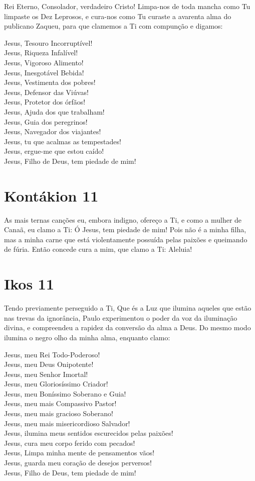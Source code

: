 \documentclass{subfiles}
\begin{document}
Rei Eterno, Consolador, verdadeiro Cristo! Limpa-nos de toda mancha
como Tu limpaste os Dez Leprosos, e cura-nos como Tu curaste a avarenta
alma do publicano Zaqueu, para que clamemos a Ti com compunção e
digamos:

Jesus, Tesouro Incorruptível! \\
Jesus, Riqueza Infalível! \\
Jesus, Vigoroso Alimento! \\
Jesus, Inesgotável Bebida! \\
Jesus, Vestimenta dos pobres! \\
Jesus, Defensor das Viúvas! \\
Jesus, Protetor dos órfãos! \\
Jesus, Ajuda dos que trabalham! \\
Jesus, Guia dos peregrinos! \\
Jesus, Navegador dos viajantes! \\
Jesus, tu que acalmas as tempestades! \\
Jesus, ergue-me que estou caído! \\
Jesus, Filho de Deus, tem piedade de mim!

\section*{Kontákion 11}

As mais ternas canções eu, embora indigno, ofereço a Ti, e como a
mulher de Canaã, eu clamo a Ti: Ó Jesus, tem piedade de mim! Pois não é a
minha filha, mas a minha carne que está violentamente possuída pelas paixões
e queimando de fúria. Então concede cura a mim, que clamo a Ti: Aleluia!

\section*{Ikos 11}

Tendo previamente perseguido a Ti, Que és a Luz que ilumina aqueles
que estão nas trevas da ignorância, Paulo experimentou o poder da voz da
iluminação divina, e compreendeu a rapidez da conversão da alma a Deus. Do
mesmo modo ilumina o negro olho da minha alma, enquanto clamo:

Jesus, meu Rei Todo-Poderoso! \\
Jesus, meu Deus Onipotente! \\
Jesus, meu Senhor Imortal! \\
Jesus, meu Gloriosíssimo Criador! \\
Jesus, meu Boníssimo Soberano e Guia! \\
Jesus, meu mais Compassivo Pastor! \\
Jesus, meu mais gracioso Soberano! \\
Jesus, meu mais misericordioso Salvador! \\
Jesus, ilumina meus sentidos escurecidos pelas paixões! \\
Jesus, cura meu corpo ferido com pecados! \\
Jesus, Limpa minha mente de pensamentos vãos! \\
Jesus, guarda meu coração de desejos perversos! \\
Jesus, Filho de Deus, tem piedade de mim!
\end{document}
